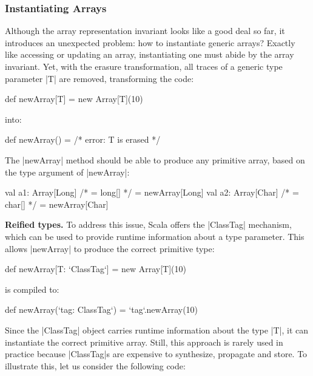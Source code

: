 \subsubsection{Instantiating Arrays}

Although the array representation invariant looks like a good deal so far, it introduces an unexpected problem: how to instantiate generic arrays? Exactly like accessing or updating an array, instantiating one must abide by the array invariant. Yet, with the erasure transformation, all traces of a generic type parameter |T| are removed, transforming the code:

\begin{lstlisting-nobreak}
 def newArray[T] = new Array[T](10)
\end{lstlisting-nobreak}

\noindent
into:

\begin{lstlisting-nobreak}
 def newArray() = /* error: T is erased */
\end{lstlisting-nobreak}

The |newArray| method should be able to produce any primitive array, based on the type argument of |newArray|:

\begin{lstlisting-nobreak}
 val a1: Array[Long] /* = long[] */ = newArray[Long]
 val a2: Array[Char] /* = char[] */ = newArray[Char]
\end{lstlisting-nobreak}

\textbf{Reified types.} To address this issue, Scala offers the |ClassTag| mechanism, which can be used to provide runtime information about a type parameter. This allows |newArray| to produce the correct primitive type:

\begin{lstlisting-nobreak}
 def newArray[T: `ClassTag`] = new Array[T](10)
\end{lstlisting-nobreak}

\noindent
is compiled to:

\begin{lstlisting-nobreak}
 def newArray(`tag: ClassTag`) = `tag`.newArray(10)
\end{lstlisting-nobreak}

Since the |ClassTag| object carries runtime information about the type |T|, it can instantiate the correct primitive array. Still, this approach is rarely used in practice because |ClassTag|s are expensive to synthesize, propagate and store.
To illustrate this, let us consider the following code:

